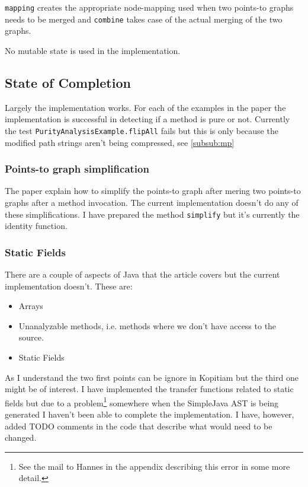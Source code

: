 \documentclass[11pt]{exam}
\begin{document}
\texttt{mapping} creates the appropriate node-mapping used when two points-to graphs needs to be merged and \texttt{combine} takes case of the actual merging of the two graphs. \newline

No mutable state is used in the implementation.

\subsection{State of Completion}

Largely the implementation works. For each of the examples in the paper the implementation is successful in detecting if a method is pure or not. Currently the test \texttt{PurityAnalysisExample.flipAll} fails but this is only because the modified path strings aren't being compressed, see \ref{subsub:mp}

\subsubsection{Points-to graph simplification}

The paper explain how to simplify the points-to graph after mering two points-to graphs after a method invocation. The current implementation doesn't do any of these simplifications. I have prepared the method \texttt{simplify} but it's currently the identity function.

\subsubsection{Static Fields}

There are a couple of aspects of Java that the article covers but the current implementation doesn't. These are:

\begin{itemize}
  \setlength{\itemsep}{1pt}
  \setlength{\parskip}{0pt}
  \item Arrays
  \item Unanalyzable methods, i.e. methods where we don't have access to the source.
  \item Static Fields
\end{itemize}

As I understand the two first points can be ignore in Kopitiam but the third one might be of interest. I have implemented the transfer functions related to static fields but due to a problem\footnote{See the mail to Hannes in the appendix describing this error in some more detail.} somewhere when the SimpleJava AST is being generated I haven't been able to complete the implementation. I have, however, added TODO comments in the code that describe what would need to be changed.
\end{document}
